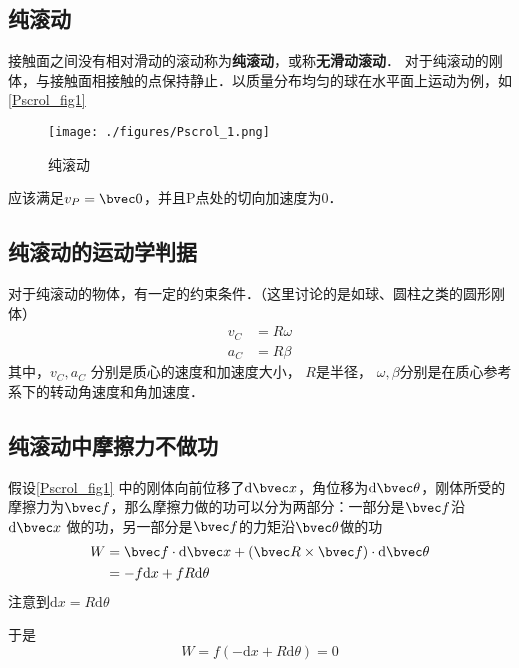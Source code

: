 


\subsection{纯滚动}
接触面之间没有相对滑动的滚动称为\textbf{纯滚动}，或称\textbf{无滑动滚动}．
对于纯滚动的刚体，与接触面相接触的点保持静止．以质量分布均匀的球在水平面上运动为例，如\autoref{Pscrol_fig1}
\begin{figure}[ht]
\centering
\texttt{[image: ./figures/Pscrol\_1.png]}
\caption{纯滚动} \label{Pscrol_fig1}
\end{figure}
应该满足$v_P=\bvec 0$，并且P点处的切向加速度为0．

\subsection{纯滚动的运动学判据}
对于纯滚动的物体，有一定的约束条件．（这里讨论的是如球、圆柱之类的圆形刚体）
\begin{equation}
\begin{aligned}
v_C&=R\omega\\
a_C&=R\beta
\end{aligned}
\end{equation}
其中，$v_C,a_C$
分别是质心的速度和加速度大小，
$R$是半径，
$\omega,\beta$分别是在质心参考系下的转动角速度和角加速度．

\subsection{纯滚动中摩擦力不做功}
假设\autoref{Pscrol_fig1} 中的刚体向前位移了$\mathrm{d}\bvec x$，角位移为$\mathrm{d} \bvec \theta$，刚体所受的摩擦力为$\bvec f$，那么摩擦力做的功可以分为两部分：一部分是$\bvec f$沿$\mathrm{d} \bvec x$ 做的功，另一部分是$\bvec f$的力矩沿$\bvec \theta$做的功
\begin{equation}
\begin{aligned}
W&=\bvec f\cdot\mathrm{d} \bvec x+(\bvec R\times \bvec f)\cdot\mathrm{d} \bvec \theta \notag\\
&=-f\mathrm{d} x+fR\mathrm{d} \theta
\end{aligned}
\end{equation}
注意到$\mathrm{d} x=R\mathrm{d} \theta$

于是\begin{equation}
W=f(-\mathrm{d} x+R\mathrm{d} \theta)=0
\end{equation}
